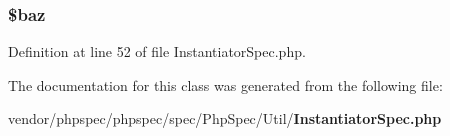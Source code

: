 \subsubsection[{\$baz}]{\setlength{\rightskip}{0pt plus 5cm}\${\bf baz}}\label{classspec_1_1_php_spec_1_1_util_1_1_with_properties_a5bede00f853b80a3359c4bf642dfc1ec}


Definition at line 52 of file Instantiator\+Spec.\+php.



The documentation for this class was generated from the following file\+:\begin{DoxyCompactItemize}
\item 
vendor/phpspec/phpspec/spec/\+Php\+Spec/\+Util/{\bf Instantiator\+Spec.\+php}\end{DoxyCompactItemize}
